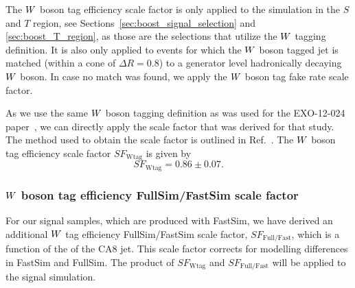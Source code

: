 The $W$ boson tag efficiency scale factor is only applied to the simulation in the $S$ and $T$
region, see Sections~\ref{sec:boost_signal_selection} and \ref{sec:boost_T_region}, as those are the
selections that utilize the $W$ tagging definition. It is also only applied to events for which
the $W$ boson tagged jet is matched (within a cone of $\Delta R = 0.8$) to a generator level
hadronically decaying $W$ boson. In case no match was found, we apply the $W$ boson tag fake rate
scale factor. 

As we use the same $W$ boson tagging definition as was used for the EXO-12-024
paper~\cite{EXO-12-024}, we can directly apply the scale factor that was derived for that study. The
method used to obtain the scale factor is outlined in Ref.~\cite{CMS-PAS-JME-13-006}. 
The $W$ boson tag efficiency scale factor $SF_{\textrm{Wtag}}$ is given by
\begin{equation}
SF_{\textrm{Wtag}} = 0.86 \pm 0.07 .
\end{equation}

\subsubsection{\texorpdfstring{$W$}{W} boson tag efficiency FullSim/FastSim scale factor
\label{sec:wtag_eff_fastfull_sf}}


For our signal samples, which are produced with FastSim, we have derived an additional $W$ tag
efficiency FullSim/FastSim scale factor, $SF_{\textrm{Full/Fast}}$, which is a function of the \pt
of the CA8 jet. This scale factor corrects for modelling differences in FastSim and FullSim. The
product of $SF_{\textrm{Wtag}}$ and $SF_{\textrm{Full/Fast}}$ will be applied to the signal
simulation. 

